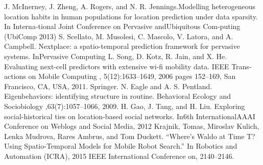 \begin{thebibliography}{99}

 J.  McInerney,  J.  Zheng,  A.  Rogers,  and  N.  R.  Jennings.Modelling heterogeneous location habits in human populations for location prediction under data sparsity. In Interna-tional Joint Conference on Pervasive andUbiquitous Com-puting (UbiComp 2013)
  S.  Scellato,   M.  Musolesi,   C.  Mascolo,   V.  Latora,   and A.  Campbell. Nextplace:   a  spatio-temporal  prediction framework for pervasive systems.  InPervasive Computing
 L. Song, D. Kotz, R. Jain, and X. He.  Evaluating next-cell predictors with extensive wi-fi mobility data. IEEE Trans-actions on Mobile Computing , 5(12):1633–1649, 2006 pages 152–169, San Francisco, CA, USA, 2011. Springer.
N. Eagle and A. S. Pentland.   Eigenbehaviors:  identifying structure in routine. Behavioral Ecology and Sociobiology ,63(7):1057–1066, 2009.
 H.  Gao,  J.  Tang,  and  H.  Liu.   Exploring  social-historical ties on location-based social networks.  In6th InternationalAAAI Conference on Weblogs and Social Media, 2012
 Krajnik, Tomas, Miroslav Kulich, Lenka Mudrova, Rares Ambrus, and Tom Duckett. “Where’s Waldo at Time T? Using Spatio-Temporal Models for Mobile Robot Search.” In Robotics and Automation (ICRA), 2015 IEEE International Conference on, 2140–2146.

\end{thebibliography}



